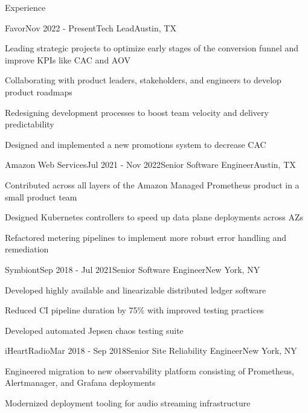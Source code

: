 \documentclass[
	11pt, %
]{resume} %
\begin{document}
\begin{rSection}{Experience}

	\begin{rSubsection}{Favor}{Nov 2022 - Present}{Tech Lead}{Austin, TX}
        \item Leading strategic projects to optimize early stages of the conversion funnel and improve KPIs like CAC and AOV
        \item Collaborating with product leaders, stakeholders, and engineers to develop product roadmaps
        \item Redesigning development processes to boost team velocity and delivery predictability
        \item Designed and implemented a new promotions system to decrease CAC
	\end{rSubsection}


    \begin{rSubsection}{Amazon Web Services}{Jul 2021 - Nov 2022}{Senior Software Engineer}{Austin, TX}
        \item Contributed across all layers of the Amazon Managed Prometheus product in a small product team
        \item Designed Kubernetes controllers to speed up data plane deployments across AZs
        \item Refactored metering pipelines to implement more robust error handling and remediation
    \end{rSubsection}

    \begin{rSubsection}{Symbiont}{Sep 2018 - Jul 2021}{Senior Software Engineer}{New York, NY}
        \item Developed highly available and linearizable distributed ledger software
        \item Reduced CI pipeline duration by 75\% with improved testing practices
        \item Developed automated Jepsen chaos testing suite
    \end{rSubsection}


    \begin{rSubsection}{iHeartRadio}{Mar 2018 - Sep 2018}{Senior Site Reliability Engineer}{New York, NY}
        \item Engineered migration to new observability platform consisting of Prometheus, Alertmanager, and Grafana deployments
        \item Modernized deployment tooling for audio streaming infrastructure
    \end{rSubsection}


\end{rSection}
\end{document}
